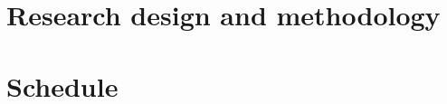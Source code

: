 \documentclass[journal,onecolumn]{IEEEtran}
\begin{document}


\section{Research design and methodology} %


\section{Schedule} %
\end{document}
